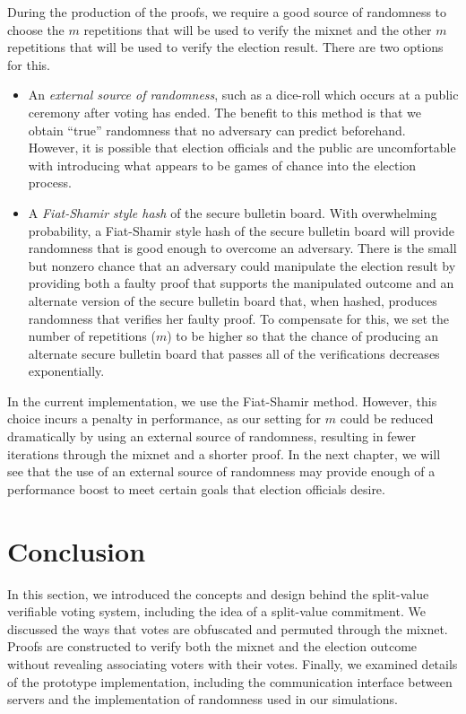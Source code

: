 During the production of the proofs, we require a good source of randomness to choose the $m$ repetitions that will be used to verify the mixnet and the other $m$ repetitions that will be used to verify the election result. There are two options for this.
\begin{itemize}
\item An \emph{external source of randomness}, such as a dice-roll which occurs at a public ceremony after voting has ended. The benefit to this method is that we obtain ``true'' randomness that no adversary can predict beforehand. However, it is possible that election officials and the public are uncomfortable with introducing what appears to be games of chance into the election process.
\item A \emph{Fiat-Shamir style hash} of the secure bulletin board. With overwhelming probability, a Fiat-Shamir style hash of the secure bulletin board will provide randomness that is good enough to overcome an adversary. There is the small but nonzero chance that an adversary could manipulate the election result by providing both a faulty proof that supports the manipulated outcome and an alternate version of the secure bulletin board that, when hashed, produces randomness that verifies her faulty proof. To compensate for this, we set the number of repetitions ($m$) to be higher so that the chance of producing an alternate secure bulletin board that passes all of the verifications decreases exponentially.
\end{itemize}

In the current implementation, we use the Fiat-Shamir method. However, this choice incurs a penalty in performance, as our setting for $m$ could be reduced dramatically by using an external source of randomness, resulting in fewer iterations through the mixnet and a shorter proof. In the next chapter, we will see that the use of an external source of randomness may provide enough of a performance boost to meet certain goals that election officials desire.

\section{Conclusion} \label{sv:conclusion}

In this section, we introduced the concepts and design behind the split-value verifiable voting system, including the idea of a split-value commitment. We discussed the ways that votes are obfuscated and permuted through the mixnet. Proofs are constructed to verify both the mixnet and the election outcome without revealing associating voters with their votes. Finally, we examined details of the prototype implementation, including the communication interface between servers and the implementation of randomness used in our simulations.

